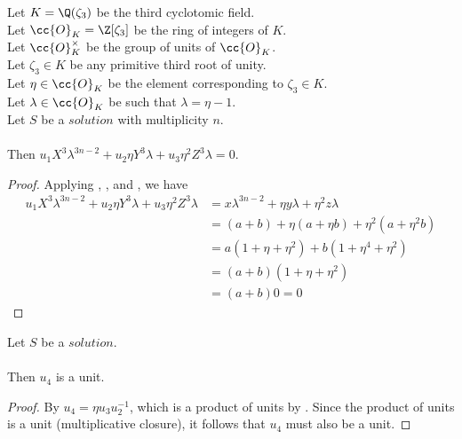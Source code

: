 \begin{lemma}
  \label{lmm:formula1}
  \leanok
  Let $K = \Q(\zeta_3)$ be the third cyclotomic field. \\
  Let $\cc{O}_K = \Z[\zeta_3]$ be the ring of integers of $K$. \\
  Let $\cc{O}^\times_K$ be the group of units of $\cc{O}_K$. \\
  Let $\zeta_3 \in K$ be any primitive third root of unity. \\
  Let $\eta \in \cc{O}_K$ be the element corresponding to $\zeta_3 \in K$. \\
  Let $\lambda \in \cc{O}_K$ be such that $\lambda = \eta -1$. \\
  Let $S$ be a $solution$ with multiplicity $n$.\\\\
  Then $u_1 X^3 \lambda^{3n-2}+u_2 \eta Y^3 \lambda +
  u_3 \eta^2 Z^3 \lambda = 0$.
\end{lemma}
\begin{proof}
  \leanok
  Applying , ,
   and , we have
  \begin{align*}
      u_1 X^3 \lambda^{3n-2}+u_2 \eta Y^3 \lambda + u_3 \eta^2 Z^3 \lambda
      &= x \lambda^{3n-2} + \eta y \lambda + \eta^2 z \lambda \\
      &= (a+b) + \eta (a+\eta b) + \eta^2 (a+\eta^2 b) \\
      &= a (1 + \eta + \eta^2) + b (1 + \eta^4 + \eta^2) \\
      &= (a+b)(1+\eta+\eta^2)\\
      &= (a+b)0 = 0
  \end{align*}
\end{proof}

\begin{lemma}
  \label{lmm:u₄_isUnit}
  \leanok
  Let $S$ be a $solution$.\\\\
  Then $u_4$ is a unit.
\end{lemma}
\begin{proof}
  \leanok
  By  $u_4 = \eta u_3 u_2^{-1}$,
  which is a product of units by .
  Since the product of units is a unit (multiplicative closure),
  it follows that $u_4$ must also be a unit.
\end{proof}

